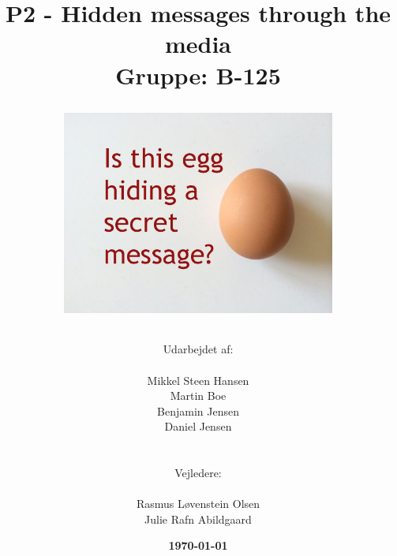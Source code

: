 \documentclass[11pt]{article}
\title{
    P2 - Hidden messages through the media 
    \\ 
    Gruppe: B-125
    \\
    \begin{figure}[!h]
        \centering
        \includegraphics[width=0.8\textwidth, angle =0]{Projectdoc/Egg-Message.jpg}
        \label{fig:FrontPage}
    \end{figure}
}
\author{
    Udarbejdet af:\\
    \\
    Mikkel Steen Hansen\\
    Martin Boe\\
    Benjamin Jensen\\
    Daniel Jensen\\
    \\\\
    Vejledere:\\ 
    \\
    Rasmus Løvenstein Olsen\\
    Julie Rafn Abildgaard\\
}
\date{\textbf{\today}}
\renewcommand{\baselinestretch}{1.20}
\begin{document}
    \begin{titlepage}
        \clearpage
        \maketitle
        \thispagestyle{empty}
    \end{titlepage}
    
    
    
    \renewcommand{\baselinestretch}{0.8} 
    \tableofcontents
    \renewcommand{\baselinestretch}{1.20} 
    \newpage
    
    
    
    
    
    
    
    
    
    
    
    
    
    
    
    \newpage
    
    
\end{document}
